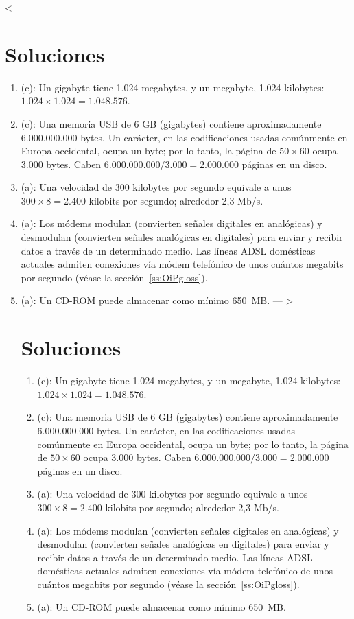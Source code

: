 \begin{enumerate}
\begin{enumerate}
< \section{Soluciones} \begin{enumerate} \item (c): Un gigabyte tiene 1.024 megabytes, y un megabyte, 1.024 kilobytes: $1.024 \times 1.024 = 1.048.576$. \item (c): Una memoria USB de 6 GB (gigabytes) contiene aproximadamente 6.000.000.000 bytes. Un carácter, en las codificaciones usadas común\-mente en Europa occidental, ocupa un byte; por lo tanto, la página de $50\times60$ ocupa 3.000 bytes. Caben $6.000.000.000/3.000=2.000.000$ páginas en un disco. \item (a): Una velocidad de 300 kilobytes por segundo equivale a unos $300 \times 8=2.400$ kilobits por segundo; alrededor 2,3 Mb/s. \item (a): Los módems modulan (convierten señales digitales en analógicas) y desmodulan (convierten señales analógicas en digitales) para enviar y recibir datos a través de un determinado medio. Las líneas ADSL domésticas actuales admiten conexiones vía módem telefónico de unos cuántos megabits por segundo (véase la sección~\ref{ss:OiPgloss}). \item (a): Un CD-ROM puede almacenar como mínimo 650~MB. 
---
> \section{Soluciones} \begin{enumerate} \item (c): Un gigabyte tiene 1.024 megabytes, y un megabyte, 1.024 kilobytes: $1.024 \times 1.024 = 1.048.576$. \item (c): Una memoria USB de 6 GB (gigabytes) contiene aproximadamente 6.000.000.000 bytes. Un carácter, en las codificaciones usadas comúnmente en Europa occidental, ocupa un byte; por lo tanto, la página de $50\times60$ ocupa 3.000 bytes. Caben $6.000.000.000/3.000=2.000.000$ páginas en un disco. \item (a): Una velocidad de 300 kilobytes por segundo equivale a unos $300 \times 8=2.400$ kilobits por segundo; alrededor 2,3 Mb/s. \item (a): Los módems modulan (convierten señales digitales en analógicas) y desmodulan (convierten señales analógicas en digitales) para enviar y recibir datos a través de un determinado medio. Las líneas ADSL domésticas actuales admiten conexiones vía módem telefónico de unos cuántos megabits por segundo (véase la sección~\ref{ss:OiPgloss}). \item (a): Un CD-ROM puede almacenar como mínimo 650~MB. 

\end{enumerate}
\end{enumerate}
\end{enumerate}
\end{enumerate}
